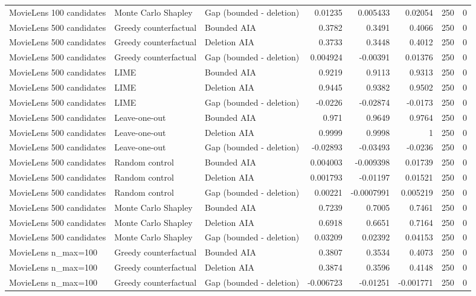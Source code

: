 \begin{table}[t]
{\begin{tabular}{lllrrrrr}
MovieLens 100 candidates & Monte Carlo Shapley & Gap (bounded - deletion) & 0.01235 & 0.005433 & 0.02054 & 250 & 0 \\
MovieLens 500 candidates & Greedy counterfactual & Bounded AIA & 0.3782 & 0.3491 & 0.4066 & 250 & 0 \\
MovieLens 500 candidates & Greedy counterfactual & Deletion AIA & 0.3733 & 0.3448 & 0.4012 & 250 & 0 \\
MovieLens 500 candidates & Greedy counterfactual & Gap (bounded - deletion) & 0.004924 & -0.00391 & 0.01376 & 250 & 0 \\
MovieLens 500 candidates & LIME & Bounded AIA & 0.9219 & 0.9113 & 0.9313 & 250 & 0 \\
MovieLens 500 candidates & LIME & Deletion AIA & 0.9445 & 0.9382 & 0.9502 & 250 & 0 \\
MovieLens 500 candidates & LIME & Gap (bounded - deletion) & -0.0226 & -0.02874 & -0.0173 & 250 & 0 \\
MovieLens 500 candidates & Leave-one-out & Bounded AIA & 0.971 & 0.9649 & 0.9764 & 250 & 0 \\
MovieLens 500 candidates & Leave-one-out & Deletion AIA & 0.9999 & 0.9998 & 1 & 250 & 0 \\
MovieLens 500 candidates & Leave-one-out & Gap (bounded - deletion) & -0.02893 & -0.03493 & -0.0236 & 250 & 0 \\
MovieLens 500 candidates & Random control & Bounded AIA & 0.004003 & -0.009398 & 0.01739 & 250 & 0 \\
MovieLens 500 candidates & Random control & Deletion AIA & 0.001793 & -0.01197 & 0.01521 & 250 & 0 \\
MovieLens 500 candidates & Random control & Gap (bounded - deletion) & 0.00221 & -0.0007991 & 0.005219 & 250 & 0 \\
MovieLens 500 candidates & Monte Carlo Shapley & Bounded AIA & 0.7239 & 0.7005 & 0.7461 & 250 & 0 \\
MovieLens 500 candidates & Monte Carlo Shapley & Deletion AIA & 0.6918 & 0.6651 & 0.7164 & 250 & 0 \\
MovieLens 500 candidates & Monte Carlo Shapley & Gap (bounded - deletion) & 0.03209 & 0.02392 & 0.04153 & 250 & 0 \\
MovieLens n\_max=100 & Greedy counterfactual & Bounded AIA & 0.3807 & 0.3534 & 0.4073 & 250 & 0 \\
MovieLens n\_max=100 & Greedy counterfactual & Deletion AIA & 0.3874 & 0.3596 & 0.4148 & 250 & 0 \\
MovieLens n\_max=100 & Greedy counterfactual & Gap (bounded - deletion) & -0.006723 & -0.01251 & -0.001771 & 250 & 0 \\

\end{tabular}}
\end{table}
